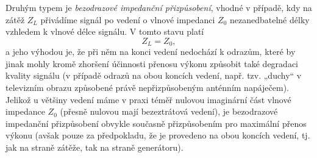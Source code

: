         Druhým typem je \emph{bezodrazové impedanční přizpůsobení}, vhodné v případě, kdy na zátěž \(Z_L\) 
        přivádíme signál po vedení o vlnové impedanci \(Z_0\) nezanedbatelné délky vzhledem k vlnové délce 
        signálu. V tomto stavu platí
        \begin{equation}\label{RA:eq_smith06}
          Z_L = Z_0,
        \end{equation}  
        a jeho výhodou je, že při něm na konci vedení nedochází k odrazům, které by jinak mohly kromě 
        zhoršení účinnosti přenosu výkonu způsobit také degradaci kvality signálu (v případě odrazů na obou 
        koncích vedení, např. tzv. „duchy“ v televizním obrazu způsobené právě nepřizpůsobeným anténním 
        napáječem). Jelikož u většiny vedení máme v praxi téměř nulovou imaginární část vlnové impedance 
        \(Z_0\) (přesně nulovou mají bezeztrátová vedení), je bezodrazové impedanční přizpůsobení obvykle 
        současně přizpůsobením pro maximální přenos výkonu (avšak pouze za předpokladu, že je provedeno na 
        obou koncích vedení, tj. jak na straně zátěže, tak na straně generátoru).
  
